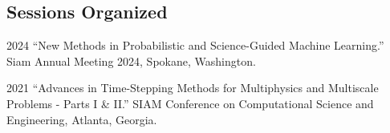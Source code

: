 \documentclass[11pt,letterpaper]{report}
\begin{document}




    \subsection*{Sessions Organized}

    \begin{tablist}

        \item[2024] \tab{}\enquote{New Methods in Probabilistic and Science-Guided Machine Learning.}
        Siam Annual Meeting 2024, Spokane, Washington.

        \item[2021] \tab{}\enquote{Advances in Time-Stepping Methods for Multiphysics and Multiscale Problems - Parts I \& II.}
        SIAM Conference on Computational Science and Engineering, Atlanta, Georgia.

    \end{tablist}



\end{document}
